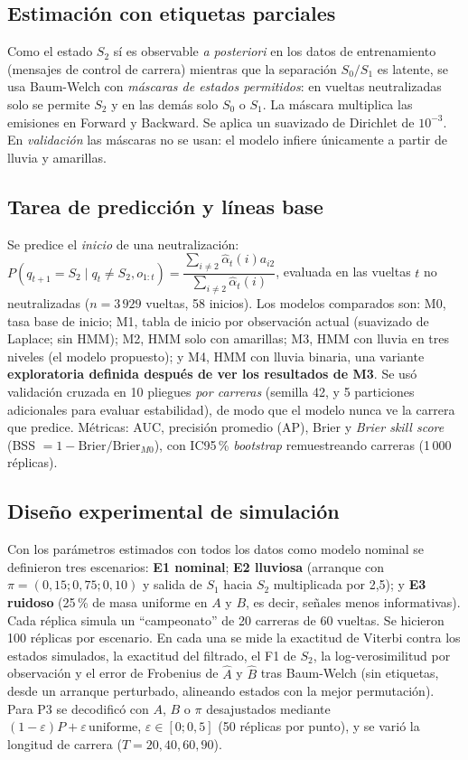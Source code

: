 \documentclass[11pt,letterpaper]{article}
\begin{document}
\subsection{Estimación con etiquetas parciales}
Como el estado $S_2$ sí es observable \emph{a posteriori} en los datos de entrenamiento (mensajes de control de carrera) mientras que la separación $S_0/S_1$ es latente, se usa Baum-Welch con \emph{máscaras de estados permitidos}: en vueltas neutralizadas solo se permite $S_2$ y en las demás solo $S_0$ o $S_1$. La máscara multiplica las emisiones en Forward y Backward. Se aplica un suavizado de Dirichlet de $10^{-3}$. En \emph{validación} las máscaras no se usan: el modelo infiere únicamente a partir de lluvia y amarillas.

\subsection{Tarea de predicción y líneas base}
Se predice el \emph{inicio} de una neutralización: $P(q_{t+1}=S_2\mid q_t\neq S_2,o_{1:t})=\dfrac{\sum_{i\neq 2}\hat\alpha_t(i)a_{i2}}{\sum_{i\neq 2}\hat\alpha_t(i)}$, evaluada en las vueltas $t$ no neutralizadas ($n=3\,929$ vueltas, 58 inicios). Los modelos comparados son: M0, tasa base de inicio; M1, tabla de inicio por observación actual (suavizado de Laplace; sin HMM); M2, HMM solo con amarillas; M3, HMM con lluvia en tres niveles (el modelo propuesto); y M4, HMM con lluvia binaria, una variante \textbf{exploratoria definida después de ver los resultados de M3}. Se usó validación cruzada en 10 pliegues \emph{por carreras} (semilla 42, y 5 particiones adicionales para evaluar estabilidad), de modo que el modelo nunca ve la carrera que predice. Métricas: AUC, precisión promedio (AP), Brier y \emph{Brier skill score} (BSS $=1-\mathrm{Brier}/\mathrm{Brier}_{M0}$), con IC95\,\% \emph{bootstrap} remuestreando carreras (1\,000 réplicas).

\subsection{Diseño experimental de simulación}
Con los parámetros estimados con todos los datos como modelo nominal se definieron tres escenarios: \textbf{E1 nominal}; \textbf{E2 lluviosa} (arranque con $\pi=(0{,}15;0{,}75;0{,}10)$ y salida de $S_1$ hacia $S_2$ multiplicada por 2,5); y \textbf{E3 ruidoso} (25\,\% de masa uniforme en $A$ y $B$, es decir, señales menos informativas). Cada réplica simula un ``campeonato'' de 20 carreras de 60 vueltas. Se hicieron 100 réplicas por escenario. En cada una se mide la exactitud de Viterbi contra los estados simulados, la exactitud del filtrado, el F1 de $S_2$, la log-verosimilitud por observación y el error de Frobenius de $\hat A$ y $\hat B$ tras Baum-Welch (sin etiquetas, desde un arranque perturbado, alineando estados con la mejor permutación). Para P3 se decodificó con $A$, $B$ o $\pi$ desajustados mediante $(1-\varepsilon)P+\varepsilon\,\mathrm{uniforme}$, $\varepsilon\in[0;0{,}5]$ (50 réplicas por punto), y se varió la longitud de carrera ($T=20,40,60,90$).
\end{document}
